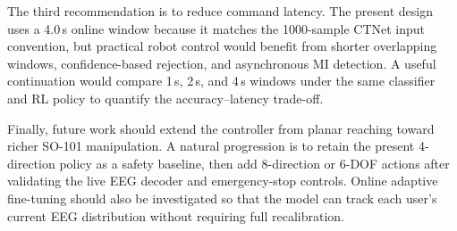 \documentclass[12pt, a4paper]{article}
\begin{document}
The third recommendation is to reduce command latency. The present design uses a 4.0\,s online window because it matches the 1000-sample CTNet input convention, but practical robot control would benefit from shorter overlapping windows, confidence-based rejection, and asynchronous MI detection. A useful continuation would compare 1\,s, 2\,s, and 4\,s windows under the same classifier and RL policy to quantify the accuracy--latency trade-off.

Finally, future work should extend the controller from planar reaching toward richer SO-101 manipulation. A natural progression is to retain the present 4-direction policy as a safety baseline, then add 8-direction or 6-DOF actions after validating the live EEG decoder and emergency-stop controls. Online adaptive fine-tuning should also be investigated so that the model can track each user's current EEG distribution without requiring full recalibration.
\end{document}
